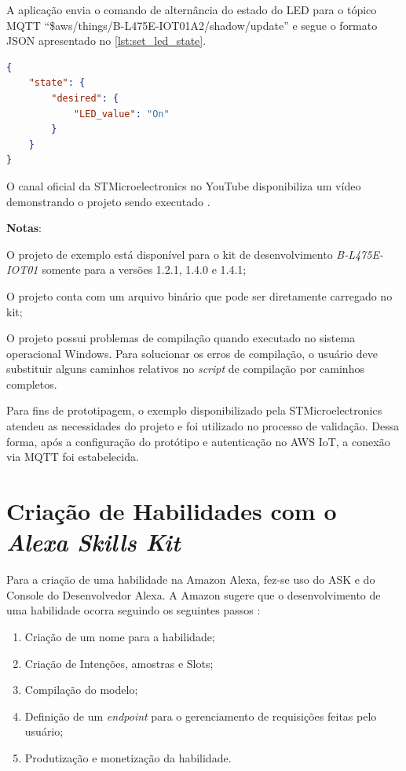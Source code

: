 A aplicação envia o comando de alternância do estado do LED para o tópico MQTT ``\$aws/things/B-L475E-IOT01A2/shadow/update'' e segue o formato JSON apresentado no \autoref{lst:set_led_state}.

\begin{lstlisting}[float=htbp,language=json,firstnumber=1,caption={Formato da mensagem de alternância do estado do LED.},label=lst:set_led_state]
{
    "state": {
        "desired": {
            "LED_value": "On"
        }
    }
}
\end{lstlisting}

O canal oficial da STMicroelectronics no YouTube disponibiliza um vídeo demonstrando o projeto sendo executado \cite{ref:041}.

\textbf{Notas}:
\begin{alineas}
    \item O projeto de exemplo está disponível para o kit de desenvolvimento \textit{B-L475E-IOT01} somente para a versões 1.2.1, 1.4.0 e 1.4.1;
    \item O projeto conta com um arquivo binário que pode ser diretamente carregado no kit;
    \item O projeto possui problemas de compilação quando executado no sistema operacional Windows. Para solucionar os erros de compilação, o usuário deve substituir alguns caminhos relativos no \textit{script} de compilação por caminhos completos.
\end{alineas}

Para fins de prototipagem, o exemplo disponibilizado pela STMicroelectronics atendeu as necessidades do projeto e foi utilizado no processo de validação. Dessa forma, após a configuração do protótipo e autenticação no AWS IoT, a conexão via MQTT foi estabelecida.

\section{Criação de Habilidades com o \textit{Alexa Skills Kit}}

Para a criação de uma habilidade na Amazon Alexa, fez-se uso do ASK e do Console do Desenvolvedor Alexa. A Amazon sugere que o desenvolvimento de uma habilidade ocorra seguindo os seguintes passos \cite{ref:042}:

\begin{enumerate}
    \item Criação de um nome para a habilidade;
    \item Criação de Intenções, amostras e Slots;\label{enum:criacao_de_intencoes_amostras_e_slots}
    \item Compilação do modelo;
    \item Definição de um \textit{endpoint} para o gerenciamento de requisições feitas pelo usuário;\label{enum:definicao_de_endpoint}
    \item Produtização e monetização da habilidade.
\end{enumerate}

